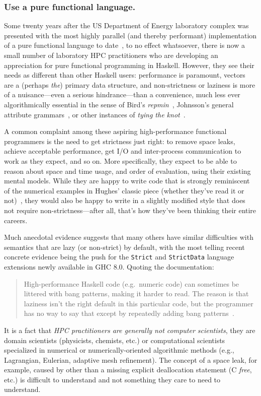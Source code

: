 \documentclass{llncs}
\begin{document}
\subsubsection{Use a pure functional language.}
Some twenty years after the US Department of Energy laboratory complex was
presented with the most highly parallel (and thereby performant)
implementation of a pure functional language to date~\cite{Davis96}, to no
effect whatsoever, there is now a small number of laboratory HPC practitioners
who are developing an appreciation for pure functional programming in Haskell.
However, they see their needs as different than other Haskell users: performance
is paramount, vectors~\cite{vector} are a (perhaps \emph{the}) primary data
structure, and non-strictness or laziness is more of a nuisance---even a
serious hindrance---than a convenience, much less ever algorithmically
essential in the sense of Bird's \emph{repmin}~\cite{Bird84},
Johnsson's general attribute grammars~\cite{Johnsson87}, 
or other instances of \emph{tying the knot}~\cite{tying-the-knot}.

A common complaint among these aspiring high-performance functional
programmers is the need to get strictness just right: to remove space leaks,
achieve acceptable performance, get I/O and inter-process communication to work
as they expect, and so on.  More specifically, they expect to be able to
reason about space and time usage, and order of evaluation, using their
existing mental models. While they are happy to write code that is strongly
reminiscent of the numerical examples in Hughes' classic piece (whether
they've read it or not)~\cite{Hughes89}, they would also be happy to write in
a slightly modified style that does not require non-strictness---after all,
that's how they've been thinking their entire careers.

Much anecdotal evidence suggests that many others have similar difficulties
with semantics that are lazy (or non-strict) by default, with the most telling
recent concrete evidence being the push for the \texttt{Strict} and
\texttt{StrictData} language extensions newly available in GHC 8.0.  Quoting
the documentation:
\begin{quote}
  High-performance Haskell code (e.g.\ numeric code) can sometimes be littered
  with bang patterns, making it harder to read. The reason is that laziness
  isn't the right default in this particular code, but the programmer has no
  way to say that except by repeatedly adding bang
  patterns~\cite{strict-strictdata}.
\end{quote}
It is a fact that \emph{HPC practitioners are generally not computer
  scientists}, they are domain scientists (physicists, chemists, etc.) or
computational scientists specialized in numerical or numerically-oriented
algorithmic methods (e.g., Lagrangian, Eulerian, adaptive mesh refinement).
The concept of a space leak, for example, caused by other than a missing
explicit deallocation statement (C \emph{free}, etc.) is difficult to
understand and not something they care to need to understand.
\end{document}
